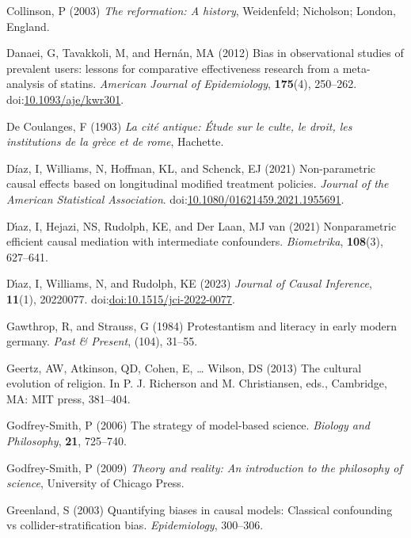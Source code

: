 \documentclass[
  single column]{article}
\newlength{\cslhangindent}
\newenvironment{CSLReferences}[2] %
 {\begin{list}{}{%
  \setlength{\itemindent}{0pt}
  \setlength{\leftmargin}{0pt}
  \setlength{\parsep}{0pt}
  \ifodd #1
   \setlength{\leftmargin}{\cslhangindent}
   \setlength{\itemindent}{-1\cslhangindent}
  \fi
  \setlength{\itemsep}{#2\baselineskip}}}
 {\end{list}}
\begin{document}
\begin{CSLReferences}{1}{0}
Collinson, P (2003) \emph{The reformation: A history}, Weidenfeld;
Nicholson; London, England.

Danaei, G, Tavakkoli, M, and Hernán, MA (2012) Bias in observational
studies of prevalent users: lessons for comparative effectiveness
research from a meta-analysis of statins. \emph{American Journal of
Epidemiology}, \textbf{175}(4), 250--262.
doi:\href{https://doi.org/10.1093/aje/kwr301}{10.1093/aje/kwr301}.

De Coulanges, F (1903) \emph{La cité antique: Étude sur le culte, le
droit, les institutions de la grèce et de rome}, Hachette.

Díaz, I, Williams, N, Hoffman, KL, and Schenck, EJ (2021) Non-parametric
causal effects based on longitudinal modified treatment policies.
\emph{Journal of the American Statistical Association}.
doi:\href{https://doi.org/10.1080/01621459.2021.1955691}{10.1080/01621459.2021.1955691}.

Dı́az, I, Hejazi, NS, Rudolph, KE, and Der Laan, MJ van (2021)
Nonparametric efficient causal mediation with intermediate confounders.
\emph{Biometrika}, \textbf{108}(3), 627--641.

Dı́az, I, Williams, N, and Rudolph, KE (2023) \emph{Journal of Causal
Inference}, \textbf{11}(1), 20220077.
doi:\href{https://doi.org/doi:10.1515/jci-2022-0077}{doi:10.1515/jci-2022-0077}.

Gawthrop, R, and Strauss, G (1984) Protestantism and literacy in early
modern germany. \emph{Past \& Present}, (104), 31--55.

Geertz, AW, Atkinson, QD, Cohen, E, \ldots{} Wilson, DS (2013) The
cultural evolution of religion. In P. J. Richerson and M. Christiansen,
eds., Cambridge, MA: MIT press, 381--404.

Godfrey-Smith, P (2006) The strategy of model-based science.
\emph{Biology and Philosophy}, \textbf{21}, 725--740.

Godfrey-Smith, P (2009) \emph{Theory and reality: An introduction to the
philosophy of science}, University of Chicago Press.

Greenland, S (2003) Quantifying biases in causal models: Classical
confounding vs collider-stratification bias. \emph{Epidemiology},
300--306.


\end{CSLReferences}
\end{document}
